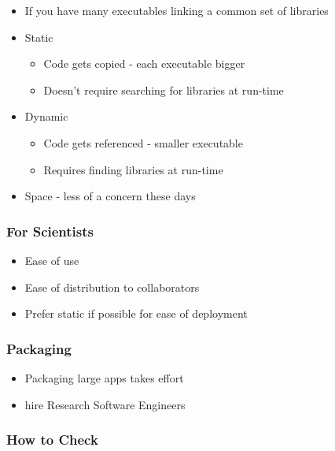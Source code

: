 \begin{itemize}
\itemsep1pt\parskip0pt
\item
  If you have many executables linking a common set of libraries
\item
  Static

  \begin{itemize}
  \itemsep1pt\parskip0pt
  \item
    Code gets copied - each executable bigger
  \item
    Doesn't require searching for libraries at run-time
  \end{itemize}
\item
  Dynamic

  \begin{itemize}
  \itemsep1pt\parskip0pt
  \item
    Code gets referenced - smaller executable
  \item
    Requires finding libraries at run-time
  \end{itemize}
\item
  Space - less of a concern these days
\end{itemize}

\subsubsection{For Scientists}\label{for-scientists}

\begin{itemize}
\itemsep1pt\parskip0pt
\item
  Ease of use
\item
  Ease of distribution to collaborators
\item
  Prefer static if possible for ease of deployment
\end{itemize}

\subsubsection{Packaging}\label{packaging}

\begin{itemize}
\itemsep1pt\parskip0pt
\item
  Packaging large apps takes effort
\item
  hire Research Software Engineers
\end{itemize}

\subsubsection{How to Check}\label{how-to-check}

